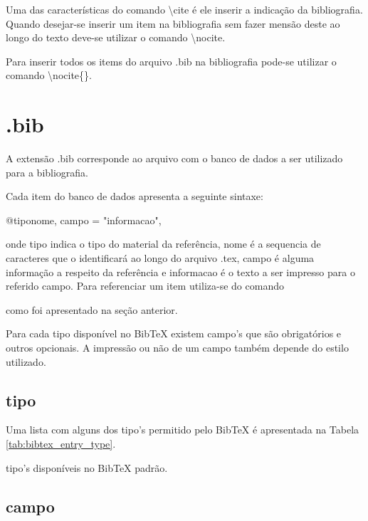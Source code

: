 Uma das características do comando \textbackslash\textsf{cite} é ele inserir a indicação da bibliografia. Quando desejar-se inserir um item na bibliografia sem fazer mensão deste ao longo do texto deve-se utilizar o comando \textbackslash\textsf{nocite}.

Para inserir todos os items do arquivo \textsf{.bib} na bibliografia pode-se utilizar o comando \textbackslash\textsf{nocite\{\textasteriskcentered\}}.

\section{\textsf{.bib}}

A extensão \textsf{.bib} corresponde ao arquivo com o banco de dados a ser utilizado para a bibliografia.

Cada item do banco de dados apresenta a seguinte sintaxe:
\begin{latexcode}
    @tipo{nome,
    campo = "informacao",
    }
\end{latexcode}
onde \textsf{tipo} indica o tipo do material da referência, \textsf{nome} é a sequencia de caracteres que o identificará ao longo do arquivo \textsf{.tex}, \textsf{campo} é alguma informação a respeito da referência e \textsf{informacao} é o texto a ser impresso para o referido \textsf{campo}. Para referenciar um item utiliza-se do comando
\begin{latexcode}
    \cite{nome}
\end{latexcode}
como foi apresentado na seção anterior.

Para cada \textsf{tipo} disponível no BibTeX existem \textsf{campo}'s que são obrigatórios e outros opcionais. A impressão ou não de um campo também depende do \textsf{estilo} utilizado.

\subsection{\textsf{tipo}}
Uma lista com alguns dos \textsf{tipo}'s permitido pelo BibTeX é apresentada na Tabela \ref{tab:bibtex_entry_type}.
\begin{table}[h!tb]
    \centering
    \caption{\textsf{tipo}'s disponíveis no BibTeX padrão.}
    \label{tab:bibtex_entry_type}
    
\end{table}

\subsection{\textsf{campo}}

